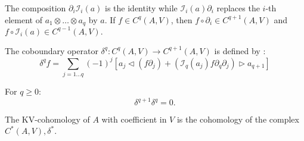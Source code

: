 The composition $\partial_i \mathcal{I}_i(a)$ is the identity while $\mathcal{I}_i(a) \partial_i$ replaces the $i$-th element of $a_1 \otimes \dots \otimes a_q$ by $a.$
If $f \in C^q(A,V)$, then $f \circ \partial_i \in C^{q+1}(A,V)$ and $f \circ \mathcal{I}_i(a) \in C^{q-1}(A,V).$ 
\begin{defn}
    \label{def:kv_coboundary}
    The coboundary operator $\delta^q \colon C^q \left( A,V \right) \to C^{q+1}\left( A,V \right)$ is defined by \cite{Boyom2002}:
    \begin{equation}
        \label{eq:coboundary}
        \delta^q f = \sum_{j=1 \dots q} \left( -1 \right)^j \left[ a_j  \triangleleft \left(f \partial_j\right) + \left(\mathcal{I}_q(a_j) f \partial_{q}\partial_j\right)\triangleright a_{q+1}  \right]
    \end{equation}
\end{defn}
\begin{prop}
    \label{prop:delta_square}
    For $q \geq 0:$
    \begin{equation}
    \label{eq:delta_square}
    \delta^{q+1} \delta^q = 0.
    \end{equation}
\end{prop}
\begin{defn}
\label{def:kv_cohomology}
The KV-cohomology of $A$ with coefficient in $V$ is the cohomology of the complex $C^*\left( A,V \right), \delta^*.$
\end{defn}
